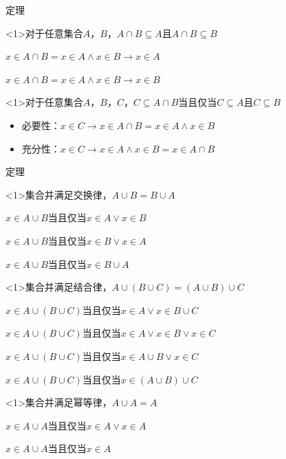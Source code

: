 \documentclass[xetex,10pt,aspectratio=43]{beamer}
\begin{document}
	\begin{frame}{定理}
		
		\begin{block}<1>{对于任意集合$A$，$B$，$A\cap B\subseteq A$且$A\cap B\subseteq B$}
			
			$x\in A\cap B=x\in A\wedge x\in B\rightarrow x\in A$
			
			$x\in A\cap B=x\in A\wedge x\in B\rightarrow x\in B$
			
		\end{block}
	
		\begin{block}<1>{对于任意集合$A$，$B$，$C$，$C\subseteq A\cap B$当且仅当$C\subseteq A$且$C\subseteq B$}
			
			\begin{itemize}
				
				\item<1>必要性：$x\in C\rightarrow x\in A\cap B=x\in A\wedge x\in B$
				
				\item<1>充分性：$x\in C\rightarrow x\in A\wedge x\in B=x\in A\cap B$
				
			\end{itemize}
			
		\end{block}
	
	\end{frame}

	\begin{frame}{定理}
	
		\begin{block}<1>{集合并满足交换律，$A\cup B=B\cup A$}
			
			$x\in A\cup B$当且仅当$x\in A\vee x\in B$
			
			$x\in A\cup B$当且仅当$x\in B\vee x\in A$
			
			$x\in A\cup B$当且仅当$x\in B\cup A$
			
		\end{block}
		
		\begin{block}<1>{集合并满足结合律，$A\cup (B\cup C)=(A\cup B)\cup C$}
			
			$x\in A\cup(B\cup C)$当且仅当$x\in A\vee x\in B\cup C$
			
			$x\in A\cup(B\cup C)$当且仅当$x\in A\vee x\in B\vee x\in C$
			
			$x\in A\cup(B\cup C)$当且仅当$x\in A\cup B\vee x\in C$
			
			$x\in A\cup(B\cup C)$当且仅当$x\in(A\cup B)\cup C$
			
		\end{block}
		
		\begin{block}<1>{集合并满足幂等律，$A\cup A=A$}
			
			$x\in A\cup A$当且仅当$x\in A\vee x\in A$
			
			$x\in A\cup A$当且仅当$x\in A$
			
		\end{block}
		
	\end{frame}
	
\end{document}
